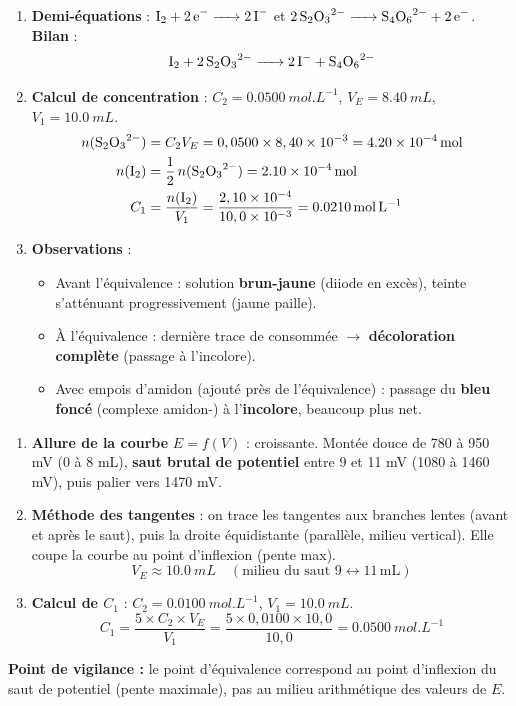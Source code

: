\documentclass[11pt]{article}
\begin{document}
\begin{corrige}
\begin{enumerate}
\item \textbf{Demi-équations} : $\ce{I2 + 2e- -> 2I-}$ et $\ce{2S2O3^2- -> S4O6^2- + 2e-}$. \textbf{Bilan} :
\[ \ce{I2 + 2S2O3^2- -> 2I- + S4O6^2-} \]
\item \textbf{Calcul de concentration} : $C_2 = \SI{0,0500}{mol.L^{-1}}$, $V_E = \SI{8,40}{mL}$, $V_1 = \SI{10,0}{mL}$.
\begin{align*}
n(\ce{S2O3^2-}) &= C_2 V_E = 0,0500 \times 8,40\times10^{-3} = \SI{4,20e-4}{mol} \\
n(\ce{I2}) &= \frac{1}{2}\,n(\ce{S2O3^2-}) = \SI{2,10e-4}{mol} \\
C_1 &= \frac{n(\ce{I2})}{V_1} = \frac{2,10\times10^{-4}}{10,0\times10^{-3}} = \SI{0,0210}{mol.L^{-1}}
\end{align*}
\item \textbf{Observations} :
\begin{itemize}
    \item Avant l'équivalence : solution \textbf{brun-jaune} (diiode en excès), teinte s'atténuant progressivement (jaune paille).
    \item À l'équivalence : dernière trace de  consommée $\rightarrow$ \textbf{décoloration complète} (passage à l'incolore).
    \item Avec empois d'amidon (ajouté près de l'équivalence) : passage du \textbf{bleu foncé} (complexe amidon-) à l'\textbf{incolore}, beaucoup plus net.
\end{itemize}
\end{enumerate}
\end{corrige}

\begin{corrige}
\begin{enumerate}
\item \textbf{Allure de la courbe} $E = f(V)$ : croissante. Montée douce de 780 à 950 mV (0 à 8 mL), \textbf{saut brutal de potentiel} entre 9 et 11 mV (1080 à 1460 mV), puis palier vers 1470 mV.
\item \textbf{Méthode des tangentes} : on trace les tangentes aux branches lentes (avant et après le saut), puis la droite équidistante (parallèle, milieu vertical). Elle coupe la courbe au point d'inflexion (pente max).
\[ V_E \approx \SI{10,0}{mL} \quad (\text{milieu du saut } 9 \leftrightarrow 11\,\text{mL}) \]
\item \textbf{Calcul de $C_1$} : $C_2 = \SI{0,0100}{mol.L^{-1}}$, $V_1 = \SI{10,0}{mL}$.
\[ C_1 = \frac{5 \times C_2 \times V_E}{V_1} = \frac{5 \times 0,0100 \times 10,0}{10,0} = \SI{0,0500}{mol.L^{-1}} \]
\end{enumerate}
\textbf{Point de vigilance :} le point d'équivalence correspond au point d'inflexion du saut de potentiel (pente maximale), pas au milieu arithmétique des valeurs de $E$.
\end{corrige}
\end{document}
